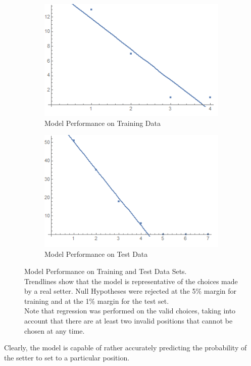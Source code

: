 \documentclass[main.tex]{subfiles}
\begin{document}
        \begin{figure}[h!]
          \begin{subfigure}{0.5\linewidth}
            \centering
            \includegraphics[width=0.70\linewidth]{figures/trainingGraph}
            \caption{Model Performance on Training Data}
            \label{fig:training}
          \end{subfigure}
          \begin{subfigure}{0.5\linewidth}
            \centering
            \includegraphics[width=0.70\linewidth]{figures/testGraph}
            \caption{Model Performance on Test Data}
            \label{fig:test}
          \end{subfigure}
          \caption{Model Performance on Training and Test Data Sets. \\
            Trendlines show that the model is representative of the choices made by a real setter. Null Hypotheses were rejected at the 5\% margin for training and at the 1\% margin for the test set. \\
            Note that regression was performed on the valid choices, taking into account that there are at least two invalid positions that cannot be chosen at any time.
            }
          \label{fig:analysis}
        \end{figure}
        
        Clearly, the model is capable of rather accurately predicting the probability of the setter to set to a particular position.
        
\end{document}
